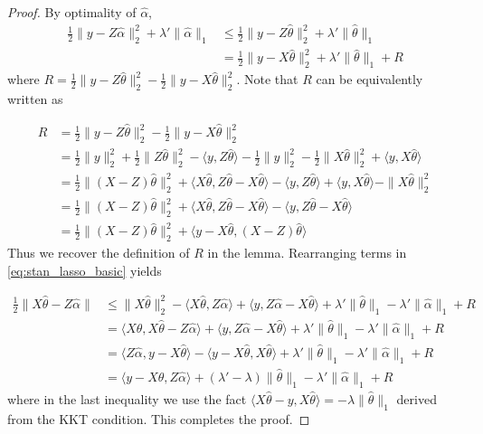 \documentclass[a4paper]{article}
\begin{document}
\begin{proof}
By optimality of $\hat{\alpha}$,
\begin{equation}
\begin{aligned}
\frac{1}{2}\|y-Z\hat{\alpha}\|_2^2 + \lambda'\|\hat{\alpha}\|_1 &\leq \frac{1}{2}\|y-Z\hat{\theta}\|_2^2 + \lambda'\|\hat{\theta}\|_1\\
&= \frac{1}{2}\|y - X\hat{\theta}\|_2^2 + \lambda'\|\hat{\theta}\|_1 + R
\label{eq:stan_lasso_basic}
\end{aligned}
\end{equation}
where $R = \frac{1}{2}\|y-Z\hat{\theta}\|_2^2 - \frac{1}{2}\|y-X\hat{\theta}\|_2^2$. Note that $R$ can be equivalently written as

\begin{align*}
R &= \frac{1}{2}\|y-Z\hat{\theta}\|_2^2 - \frac{1}{2}\|y-X\hat{\theta}\|_2^2\\
&= \frac{1}{2}\|y\|_2^2 + \frac{1}{2}\|Z\hat{\theta}\|_2^2 - \langle y, Z\hat{\theta}\rangle - \frac{1}{2}\|y\|_2^2 - \frac{1}{2}\|X\hat{\theta}\|_2^2 + \langle y, X\hat{\theta}\rangle\\
&= \frac{1}{2}\|(X-Z)\hat{\theta}\|_2^2 + \langle X\hat{\theta}, Z\hat{\theta}-X\hat{\theta}\rangle - \langle y, Z\hat{\theta}\rangle + \langle y, X\hat{\theta}\rangle - \|X\hat{\theta}\|_2^2\\
&= \frac{1}{2}\|(X-Z)\hat{\theta}\|_2^2 + \langle X\hat{\theta}, Z\hat{\theta}-X\hat{\theta}\rangle - \langle y, Z\hat{\theta}-X\hat{\theta}\rangle\\
&= \frac{1}{2}\|(X-Z)\hat{\theta}\|_2^2 + \langle y-X\hat{\theta}, (X-Z)\hat{\theta}\rangle
\end{align*}
Thus we recover the definition of $R$ in the lemma. Rearranging terms in \eqref{eq:stan_lasso_basic} yields

\begin{align*}
\frac{1}{2}\|X\hat{\theta} - Z\hat{\alpha}\| &\leq \|X\hat{\theta}\|_2^2 - \langle X\hat{\theta}, Z\hat{\alpha}\rangle + \langle y, Z\hat{\alpha}-X\hat{\theta}\rangle + \lambda'\|\hat{\theta}\|_1 - \lambda'\|\hat{\alpha}\|_1 + R\\
&= \langle X\hat{\theta}, X\hat{\theta} - Z\hat{\alpha} \rangle + \langle y, Z\hat{\alpha} - X\hat{\theta}\rangle + \lambda'\|\hat{\theta}\|_1 - \lambda'\|\hat{\alpha}\|_1 + R\\
&= \langle Z\hat{\alpha}, y-X\hat{\theta}\rangle - \langle y-X\hat{\theta}, X\hat{\theta}\rangle + \lambda'\|\hat{\theta}\|_1 - \lambda'\|\hat{\alpha}\|_1 + R\\
&= \langle y-X\hat{\theta}, Z\hat{\alpha}\rangle + (\lambda'-\lambda)\|\hat{\theta}\|_1 - \lambda'\|\hat{\alpha}\|_1 + R
\end{align*}
where in the last inequality we use the fact $\langle X\hat{\theta} - y, X\hat{\theta}\rangle = -\lambda\|\hat{\theta}\|_1$ derived from the KKT condition. This completes the proof.
\end{proof}
\end{document}
